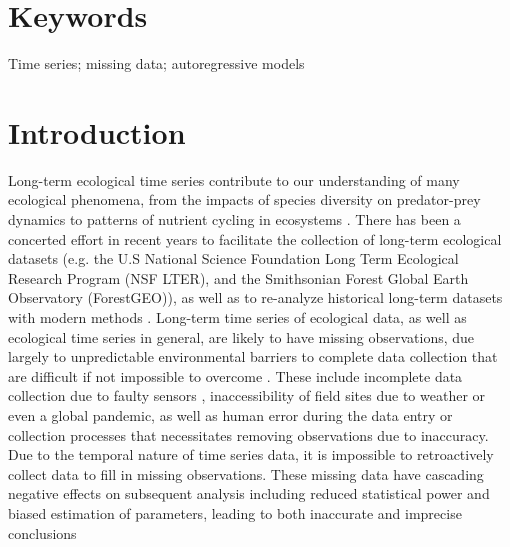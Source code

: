\documentclass{article}
\begin{document}
\section*{Keywords}
Time series; missing data; autoregressive models

\section*{Introduction} 

Long-term ecological time series contribute to our understanding of many ecological phenomena, from the impacts of species diversity on predator-prey dynamics to patterns of nutrient cycling in ecosystems \citep{Hughes2017, Likens1970, Sinclair2003}. There has been a concerted effort in recent years to facilitate the collection of long-term ecological datasets (e.g. the U.S National Science Foundation Long Term Ecological Research Program (NSF LTER), and the Smithsonian Forest Global Earth Observatory (ForestGEO)), as well as to re-analyze historical long-term datasets with modern methods \citep{Adler2009, Buma2017}. Long-term time series of ecological data, as well as ecological time series in general, are likely to have missing observations, due largely to unpredictable environmental barriers to complete data collection that are difficult if not impossible to overcome \citep{lopucki2022handling, nakagawa_missing_2008}. These include incomplete data collection due to faulty sensors \citep{hossie_confronting_2021}, inaccessibility of field sites due to weather or even a global pandemic, as well as human error during the data entry or collection processes that necessitates removing observations due to inaccuracy. Due to the temporal nature of time series data, it is impossible to retroactively collect data to fill in missing observations. These missing data have cascading negative effects on subsequent analysis including reduced statistical power \citep{kang2013prevention, moritz_imputets_2017} and biased estimation of parameters, leading to both inaccurate and imprecise conclusions \citep{aleryani2018dealing, kim_transcending_2018, junger_imputation_2015}
\end{document}
